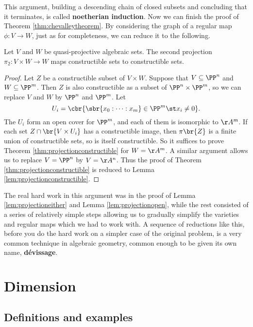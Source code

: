 This argument, building a descending chain of closed subsets and concluding that it terminates, is called \textbf{noetherian induction}. Now we can finish the proof of Theorem \ref{thm:chevalleytheorem}. By considering the graph of a regular map $ \phi : V \to W $, just as for completeness, we can reduce it to the following.

\begin{theorem}
\label{thm:projectionconstructible}
Let $ V $ and $ W $ be quasi-projective algebraic sets. The second projection $ \pi_2 : V \times W \to W $ maps constructible sets to constructible sets.
\end{theorem}

\begin{proof}
Let $ Z $ be a constructible subset of $ V \times W $. Suppose that $ V \subseteq \PP^n $ and $ W \subseteq \PP^m $. Then $ Z $ is also constructible as a subset of $ \PP^n \times \PP^m $, so we can replace $ V $ and $ W $ by $ \PP^n $ and $ \PP^m $. Let
$$ U_i = \cbr{\sbr{x_0 : \dots : x_m} \in \PP^m \st x_i \ne 0}. $$
The $ U_i $ form an open cover for $ \PP^m $, and each of them is isomorphic to $ \AA^m $. If each set $ Z \cap \br{V \times U_i} $ has a constructible image, then $ \pi\br{Z} $ is a finite union of constructible sets, so is itself constructible. So it suffices to prove Theorem \ref{thm:projectionconstructible} for $ W = \AA^m $. A similar argument allows us to replace $ V = \PP^n $ by $ V = \AA^n $. Thus the proof of Theorem \ref{thm:projectionconstructible} is reduced to Lemma \ref{lem:projectionconstructible}.
\end{proof}

The real hard work in this argument was in the proof of Lemma \ref{lem:projectioneither} and Lemma \ref{lem:projectionopen}, while the rest consisted of a series of relatively simple steps allowing us to gradually simplify the varieties and regular maps which we had to work with. A sequence of reductions like this, before you do the hard work on a simpler case of the original problem, is a very common technique in algebraic geometry, common enough to be given its own name, \textbf{d\'evissage}.

\pagebreak

\section{Dimension}

\subsection{Definitions and examples}

